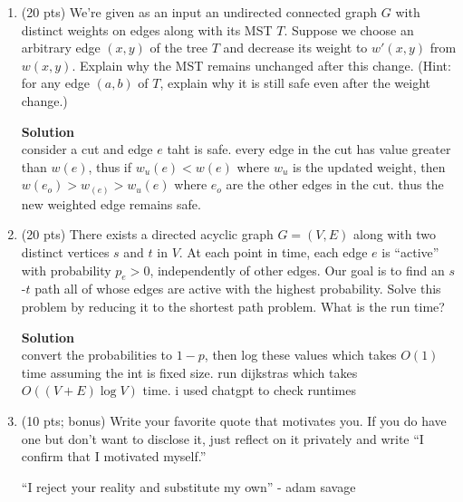 \documentclass[letterpaper,12pt]{article}
\newcommand{\solution}{\textbf{Solution}\\}
\begin{document}
\begin{enumerate}
\solution
the claimed solution could underestimate the true distance and relaxation would have no way of figuring out the problem. 


the value does not change yet the distance of 1 is wrong. 

i discussed this problem with another student and i used gpt to tikz


\newpage
\item (20 pts)  We're given as an input an undirected connected graph $G$ with distinct weights on edges along with its MST $T$. Suppose we choose an arbitrary edge $(x,y)$ of the tree $T$ and decrease its weight to $w'(x, y)$ from $w(x, y)$. Explain why the MST remains unchanged after this change. 
(Hint: for any edge $(a, b)$ of $T$, explain why it is still safe even after the weight change.)



\solution
consider a cut and edge \(e\) taht is safe. every edge in the cut has value greater than \(w(e)\), thus if \(w_u(e)<w(e)\) where \(w_u\) is the updated weight, then \(w(e_o)>w_(e)>w_u(e)\) where \(e_o\) are the other edges in the cut. thus the new weighted edge remains safe. 



\newpage
\item (20 pts)  There exists a directed acyclic graph $G = (V, E)$ along with two distinct vertices $s$ and $t$ in $V$. At each point in time, each edge $e$ is ``active'' with probability $p_e > 0$, independently of other edges. Our goal is to find an $s$-$t$ path all of whose edges are active with the highest probability. Solve this problem by reducing it to the shortest path problem. What is the run time?




\solution

convert the probabilities to \(1-p\), then log these values which takes \(O(1)\) time assuming the int is fixed size. run dijkstras which takes \(O((V+E)\log V)\) time. i used chatgpt to check runtimes




\newpage
\item (10 pts; bonus) Write your favorite quote that motivates you. If you do have one but don't want to disclose it, just reflect on it privately and write ``I confirm that I motivated myself.''

``I reject your reality and substitute my own'' - adam savage




\end{enumerate}
\end{document}
